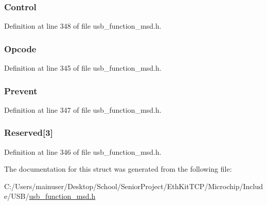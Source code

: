 \subsubsection[{Control}]{ Control}\label{struct_prevent_allow_medium_removal_c_b_a5dc24656c27deb12af74c98930f0bfc5}


Definition at line 348 of file usb\+\_\+function\+\_\+msd.\+h.

\hypertarget{struct_prevent_allow_medium_removal_c_b_a3ac7536b907732d60214ae553910eed9}{}
\subsubsection[{Opcode}]{ Opcode}\label{struct_prevent_allow_medium_removal_c_b_a3ac7536b907732d60214ae553910eed9}


Definition at line 345 of file usb\+\_\+function\+\_\+msd.\+h.

\hypertarget{struct_prevent_allow_medium_removal_c_b_a52ce51e48dc896df5ef43858f6068fb2}{}
\subsubsection[{Prevent}]{ Prevent}\label{struct_prevent_allow_medium_removal_c_b_a52ce51e48dc896df5ef43858f6068fb2}


Definition at line 347 of file usb\+\_\+function\+\_\+msd.\+h.

\hypertarget{struct_prevent_allow_medium_removal_c_b_a14c783327ec2051ddb5c5aa057f58ec3}{}
\subsubsection[{Reserved}]{ Reserved\mbox{[}3\mbox{]}}\label{struct_prevent_allow_medium_removal_c_b_a14c783327ec2051ddb5c5aa057f58ec3}


Definition at line 346 of file usb\+\_\+function\+\_\+msd.\+h.



The documentation for this struct was generated from the following file\+:\begin{DoxyCompactItemize}
\item 
C\+:/\+Users/mainuser/\+Desktop/\+School/\+Senior\+Project/\+Eth\+Kit\+T\+C\+P/\+Microchip/\+Include/\+U\+S\+B/\hyperlink{usb__function__msd_8h}{usb\+\_\+function\+\_\+msd.\+h}\end{DoxyCompactItemize}

